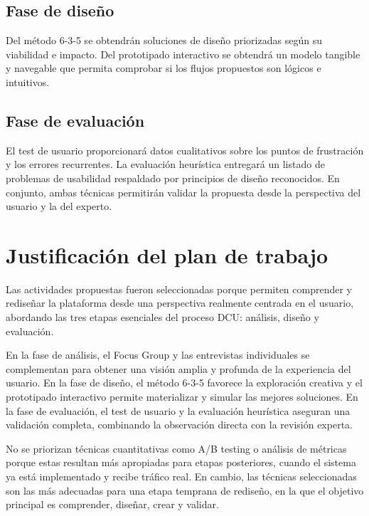 \documentclass[12pt,letterpaper]{article}
\begin{document}
\subsection{Fase de diseño}
Del método 6-3-5 se obtendrán soluciones de diseño priorizadas según su viabilidad e impacto. Del prototipado interactivo se obtendrá un modelo tangible y navegable que permita comprobar si los flujos propuestos son lógicos e intuitivos.

\subsection{Fase de evaluación}
El test de usuario proporcionará datos cualitativos sobre los puntos de frustración y los errores recurrentes. La evaluación heurística entregará un listado de problemas de usabilidad respaldado por principios de diseño reconocidos. En conjunto, ambas técnicas permitirán validar la propuesta desde la perspectiva del usuario y la del experto.

\section{Justificación del plan de trabajo}

Las actividades propuestas fueron seleccionadas porque permiten comprender y rediseñar la plataforma desde una perspectiva realmente centrada en el usuario, abordando las tres etapas esenciales del proceso DCU: análisis, diseño y evaluación.

En la fase de análisis, el Focus Group y las entrevistas individuales se complementan para obtener una visión amplia y profunda de la experiencia del usuario. En la fase de diseño, el método 6-3-5 favorece la exploración creativa y el prototipado interactivo permite materializar y simular las mejores soluciones. En la fase de evaluación, el test de usuario y la evaluación heurística aseguran una validación completa, combinando la observación directa con la revisión experta.

No se priorizan técnicas cuantitativas como A/B testing o análisis de métricas porque estas resultan más apropiadas para etapas posteriores, cuando el sistema ya está implementado y recibe tráfico real. En cambio, las técnicas seleccionadas son las más adecuadas para una etapa temprana de rediseño, en la que el objetivo principal es comprender, diseñar, crear y validar.
\end{document}
